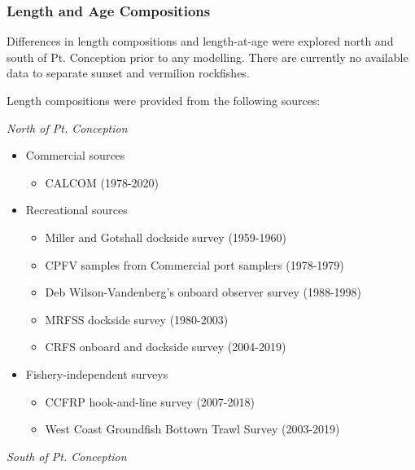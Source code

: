 \documentclass[11pt,
  english,
  a4paper,
]{article}
\begin{document}
\hypertarget{length-and-age-compositions}{%
\subsubsection{Length and Age Compositions}\label{length-and-age-compositions}}

\leavevmode\tagmcend\tagstructend

Differences in length compositions and length-at-age were explored north and south of Pt. Conception prior to any modelling. There are currently no available data to separate sunset and vermilion rockfishes.

Length compositions were provided from the following sources:

\emph{North of Pt. Conception}

\begin{itemize}[noitemsep,nolistsep,topsep=0pt]
  \item Commercial sources
    \begin{itemize}[noitemsep,nolistsep]
      \item CALCOM (1978-2020)   
     \end{itemize}  
  \item Recreational sources    
    \begin{itemize}[noitemsep,nolistsep]
       \item Miller and Gotshall dockside survey (1959-1960)
       \item CPFV samples from Commercial port samplers (1978-1979)
       \item Deb Wilson-Vandenberg's onboard observer survey (1988-1998)
       \item MRFSS dockside survey (1980-2003)     
       \item CRFS onboard and dockside survey (2004-2019)
     \end{itemize}
    \item Fishery-independent surveys
      \begin{itemize}[noitemsep,nolistsep]
        \item CCFRP hook-and-line survey (2007-2018) 
        \item West Coast Groundfish Bottown Trawl Survey  (2003-2019) 
   \end{itemize}
\end{itemize}

\emph{South of Pt. Conception}
\end{document}
